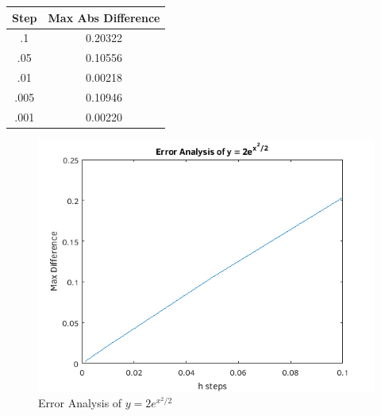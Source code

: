 \documentclass[a4paper,12pt]{article}
\begin{document}
\begin{enumerate}[I.]
\begin{enumerate}[a)]
\begin{table}[H]
      \begin{center}
        \begin{tabular}{|c|c|}
           \hline
           Step & Max Abs Difference \\
           \hline
           \hline
           .1   & 0.20322 \\
           \hline
           .05  & 0.10556 \\
           \hline
           .01  & 0.00218 \\
           \hline
           .005 & 0.10946 \\
           \hline
           .001 & 0.00220 \\
           \hline
        \end{tabular}
      \end{center}
    \end{table}
    \begin{figure}[H]
      \begin{center}
        \includegraphics[scale=.9]{114.png}
        \caption{Error Analysis of $y = 2e^{x^2/2}$}
      \end{center}
    \end{figure}
  \end{enumerate}


\end{enumerate}
\end{document}
